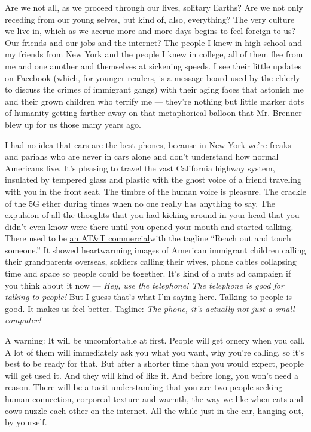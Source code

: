 Are we not all, as we proceed through our lives, solitary Earths? Are we
not only receding from our young selves, but kind of, also, everything?
The very culture we live in, which as we accrue more and more days
begins to feel foreign to us? Our friends and our jobs and the internet?
The people I knew in high school and my friends from New York and the
people I knew in college, all of them flee from me and one another and
themselves at sickening speeds. I see their little updates on Facebook
(which, for younger readers, is a message board used by the elderly to
discuss the crimes of immigrant gangs) with their aging faces that
astonish me and their grown children who terrify me --- they're nothing
but little marker dots of humanity getting farther away on that
metaphorical balloon that Mr. Brenner blew up for us those many years
ago.

I had no idea that cars are the best phones, because in New York we're
freaks and pariahs who are never in cars alone and don't understand how
normal Americans live. It's pleasing to travel the vast California
highway system, insulated by tempered glass and plastic with the ghost
voice of a friend traveling with you in the front seat. The timbre of
the human voice is pleasure. The crackle of the 5G ether during times
when no one really has anything to say. The expulsion of all the
thoughts that you had kicking around in your head that you didn't even
know were there until you opened your mouth and started talking. There
used to be \href{https://www.youtube.com/watch?v=emzK9dfL0qM}{an AT\&T
commercial}with the tagline ``Reach out and touch someone.'' It showed
heartwarming images of American immigrant children calling their
grandparents overseas, soldiers calling their wives, phone cables
collapsing time and space so people could be together. It's kind of a
nuts ad campaign if you think about it now --- \emph{Hey, use the
telephone! The telephone is good for talking to people!} But I guess
that's what I'm saying here. Talking to people is good. It makes us feel
better. Tagline: \emph{The phone, it's actually not just a small
computer!}

A warning: It will be uncomfortable at first. People will get ornery
when you call. A lot of them will immediately ask you what you want, why
you're calling, so it's best to be ready for that. But after a shorter
time than you would expect, people will get used it. And they will kind
of like it. And before long, you won't need a reason. There will be a
tacit understanding that you are two people seeking human connection,
corporeal texture and warmth, the way we like when cats and cows nuzzle
each other on the internet. All the while just in the car, hanging out,
by yourself.

